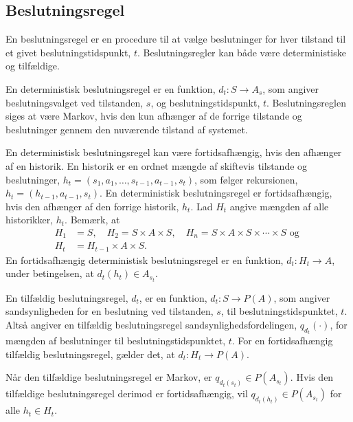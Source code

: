 


\subsection{Beslutningsregel}\label{afsnit:beslutningsregel}
En beslutningsregel er en procedure til at vælge beslutninger for hver tilstand til et givet beslutningstidspunkt, $t$. Beslutningsregler kan både være deterministiske og tilfældige.%

En deterministisk beslutningsregel er en funktion, $d_t:S\to A_s$, som angiver beslutningsvalget ved tilstanden, $s$, og beslutningstidspunkt, $t$. Beslutningsreglen siges at være Markov, hvis den kun afhænger af de forrige tilstande og beslutninger gennem den nuværende tilstand af systemet. 

En deterministisk beslutningsregel kan være fortidsafhængig, hvis den afhænger af en historik. En historik er en ordnet mængde af skiftevis tilstande og beslutninger, $h_t = (s_1, a_1, \dots,  s_{t-1}, a_{t-1}, s_t)$, som følger rekursionen, $h_t=(h_{t-1}, a_{t-1}, s_t)$. En deterministisk beslutningsregel er fortidsafhængig, hvis den afhænger af den forrige historik, $h_t$.
Lad $H_t$ angive mængden af alle historikker, $h_t$. Bemærk, at 
\begin{align*}
    H_1&=S, \quad H_2=S\times A\times S, \quad H_n =S\times A\times S\times \cdots \times S \text{ og }\\
    H_t&=H_{t-1}\times A\times S. 
\end{align*}
En fortidsafhængig deterministisk beslutningsregel er en funktion, $d_t: H_t\to A$, under betingelsen, at $d_t(h_t)\in A_{s_t}$.

En tilfældig beslutningsregel, $d_t$, er en funktion, $d_t: S\to P(A)$, som angiver sandsynligheden for en beslutning ved tilstanden, $s$, til beslutningstidspunktet, $t$. Altså angiver en tilfældig beslutningsregel sandsynlighedsfordelingen, $q_{d_t}(\cdot)$, for mængden af beslutninger til beslutningstidspunktet, $t$. For en fortidsafhængig tilfældig beslutningsregel, gælder det, at $d_t:H_t\to P(A)$.

Når den tilfældige beslutningsregel er Markov, er $q_{d_t(s_t)}\in P(A_{s_t})$. Hvis den tilfældige beslutningsregel derimod er fortidsafhængig, vil $q_{d_t(h_t)}\in P(A_{s_t})$ for alle $h_t\in H_t$.


